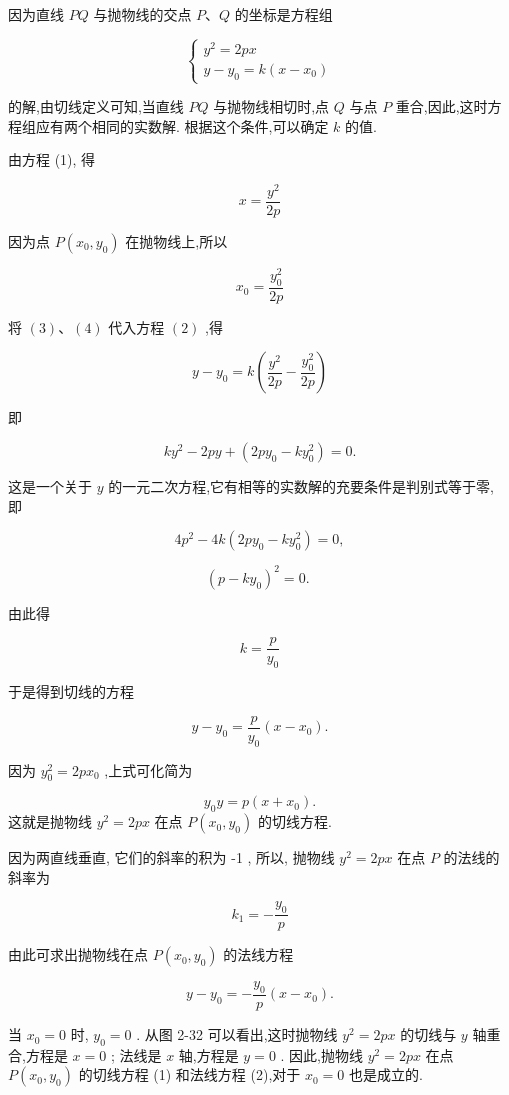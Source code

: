\documentclass[lang=cn,newtx,10.5pt,scheme=chinese]{elegantbook}
\begin{document}
因为直线 \({PQ}\) 与抛物线的交点 \(P\text{、}Q\) 的坐标是方程组

\[
  \left\{ \begin{array}{l} {y}^{2} = {2px} \\ y - {y}_{0} = k\left( {x - {x}_{0}}\right) \end{array}\right. \tag{1 2}
\]

的解,由切线定义可知,当直线 \({PQ}\) 与抛物线相切时,点 \(Q\) 与点 \(P\) 重合,因此,这时方程组应有两个相同的实数解. 根据这个条件,可以确定 \(k\) 的值.

由方程 (1), 得

\[
  x = \frac{{y}^{2}}{2p} \tag{3}
\]

因为点 \(P\left( {{x}_{0},{y}_{0}}\right)\) 在抛物线上,所以

\[
    {x}_{0} = \frac{{y}_{0}^{2}}{2p} \tag{4}
\]

将 \(\left( 3\right) \text{、}\left( 4\right)\) 代入方程 \(\left( 2\right)\) ,得

\[
  y - {y}_{0} = k\left( {\frac{{y}^{2}}{2p} - \frac{{y}_{0}^{2}}{2p}}\right)
\]

即

\[
  k{y}^{2} - {2py} + \left( {{2p}{y}_{0} - k{y}_{0}^{2}}\right) = 0.
\]

这是一个关于 \(y\) 的一元二次方程,它有相等的实数解的充要条件是判别式等于零, 即

\[
  4{p}^{2} - {4k}\left( {{2p}{y}_{0} - k{y}_{0}^{2}}\right) = 0,
\]

\[
    {\left( p - k{y}_{0}\right) }^{2} = 0\text{. }
\]

由此得

\[
  k = \frac{p}{{y}_{0}}
\]

于是得到切线的方程

\[
  y - {y}_{0} = \frac{p}{{y}_{0}}\left( {x - {x}_{0}}\right) .
\]

因为 \({y}_{0}^{2} = {2p}{x}_{0}\) ,上式可化简为

\begin{corollary}[抛物线 \({y}^{2} = {2px}\) 的切线方程]
\[
    {y}_{0}y = p\left( {x + {x}_{0}}\right) . \tag{1}
\]
这就是抛物线 \({y}^{2} = {2px}\) 在点 \(P\left( {{x}_{0},{y}_{0}}\right)\) 的切线方程.
\end{corollary}
因为两直线垂直, 它们的斜率的积为 -1 , 所以, 抛物线 \({y}^{2} = {2px}\) 在点 \(P\) 的法线的斜率为

\[
    {k}_{1} = - \frac{{y}_{0}}{p}
\]

由此可求出抛物线在点 \(P\left( {{x}_{0},{y}_{0}}\right)\) 的法线方程
\begin{corollary}[抛物线 \({y}^{2} = {2px}\) 的法线方程]
\[
  y - {y}_{0} = - \frac{{y}_{0}}{p}\left( {x - {x}_{0}}\right) . \tag{2}
\]
\end{corollary}
当 \({x}_{0} = 0\) 时, \({y}_{0} = 0\) . 从图 2-32 可以看出,这时抛物线 \({y}^{2} = {2px}\) 的切线与 \(y\) 轴重合,方程是 \(x = 0\) ; 法线是 \(x\) 轴,方程是 \(y = 0\) . 因此,抛物线 \({y}^{2} = {2px}\) 在点 \(P\left( {{x}_{0},{y}_{0}}\right)\) 的切线方程 (1) 和法线方程 (2),对于 \({x}_{0} = 0\) 也是成立的.
\end{document}

